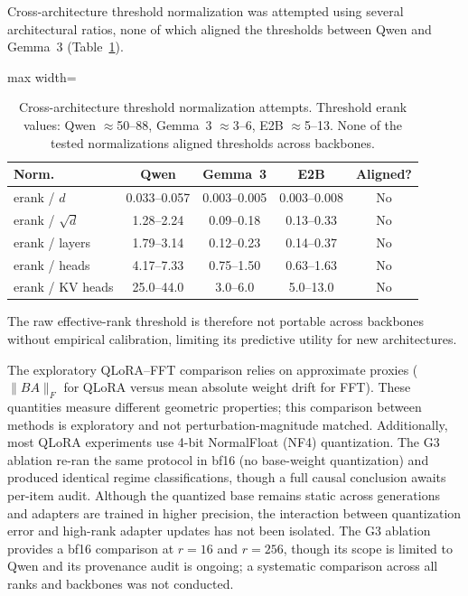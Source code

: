 \documentclass[a4paper,fleqn]{cas-dc}
\newif\ifshowchanges
\newcommand{\rev}[1]{\ifshowchanges{\color{blue}#1}\else{#1}\fi}
\renewcommand{\arraystretch}{1.8}
\begin{document}
Cross-architecture threshold normalization was attempted using several
architectural ratios, none of which aligned the thresholds between Qwen and
Gemma~3 (Table~\ref{tab:normalization}).

\begin{table}[!htbp]
\caption{Cross-architecture threshold normalization attempts. Threshold erank
values: Qwen ${\approx}$50--88, Gemma~3 ${\approx}$3--6, E2B ${\approx}$5--13. None of
the tested normalizations aligned thresholds across
backbones.}\label{tab:normalization}
\footnotesize
\renewcommand{\arraystretch}{1.4}
\begin{adjustbox}{max width=\columnwidth}
\begin{tabular}{@{}lcccc@{}}
\toprule
\textbf{Norm.} & \textbf{Qwen} & \textbf{Gemma~3} & \textbf{E2B} & \textbf{Aligned?} \\
\midrule
erank / $d$        & 0.033--0.057 & 0.003--0.005 & 0.003--0.008 & No \\
\addlinespace
erank / $\sqrt{d}$ & 1.28--2.24   & 0.09--0.18   & 0.13--0.33   & No \\
\addlinespace
erank / layers     & 1.79--3.14   & 0.12--0.23   & 0.14--0.37   & No \\
\addlinespace
erank / heads      & 4.17--7.33   & 0.75--1.50   & 0.63--1.63   & No \\
\addlinespace
erank / KV heads   & 25.0--44.0   & 3.0--6.0     & 5.0--13.0    & No \\
\bottomrule
\end{tabular}
\end{adjustbox}
\end{table}

\noindent The raw effective-rank threshold is
therefore not portable across backbones without empirical calibration, limiting
its predictive utility for new architectures.

\rev{The exploratory QLoRA--FFT comparison} relies on approximate
proxies ($\|BA\|_F$ for QLoRA versus mean absolute weight drift for FFT). These
\rev{quantities measure different geometric properties; this comparison between methods is exploratory and not perturbation-magnitude matched.} Additionally,
\rev{most QLoRA experiments use 4-bit NormalFloat (NF4) quantization. The G3 ablation re-ran the same protocol in bf16 (no base-weight quantization) and produced identical regime classifications, though a full causal conclusion awaits per-item audit. Although}
the quantized base remains static across generations and adapters are trained in
higher precision, the interaction between quantization error and high-rank
adapter updates has not been isolated. \rev{The G3 ablation provides a bf16 comparison at $r=16$ and $r=256$, though its scope is limited to Qwen and its provenance audit is ongoing; a systematic comparison across all ranks and backbones was not conducted.}
\end{document}
